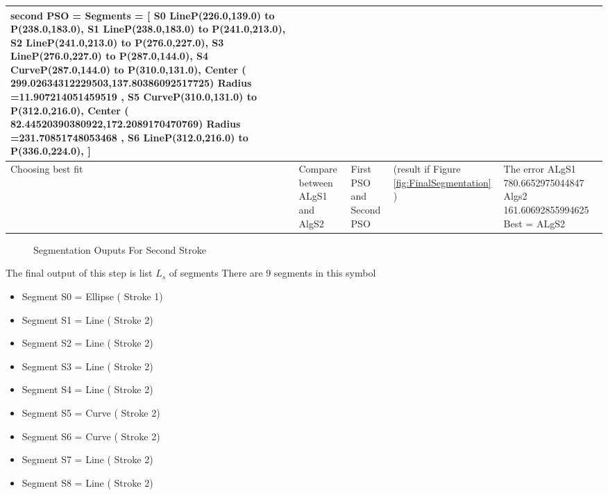 \begin{landscape}
\begin{scriptsize}
\begin{longtable}{|p{2cm}|p{2cm}|p{2cm}|p{2cm}|p{13cm}|}
  second PSO =   Segments = [   S0 Line{P(226.0,139.0) to P(238.0,183.0)},      S1 Line{P(238.0,183.0) to P(241.0,213.0)},      S2 Line{P(241.0,213.0) to P(276.0,227.0)},      S3 Line{P(276.0,227.0) to P(287.0,144.0)},      S4 Curve{P(287.0,144.0) to P(310.0,131.0),  Center ( 299.02634312229503,137.80386092517725) Radius =11.907214051459519 },  S5 Curve{P(310.0,131.0) to P(312.0,216.0),  Center ( 82.44520390380922,172.2089170470769) Radius =231.70851748053468 },  S6 Line{P(312.0,216.0) to P(336.0,224.0)}, ]  
  
 
 \\ \hline 
Choosing best fit & Compare between ALgS1 and AlgS2 &  First PSO and Second PSO  &  (result if Figure \ref{fig:FinalSegmentation} ) & 
   The error ALgS1 780.6652975044847  Algs2 161.60692855994625    Best = ALgS2  \\ \hline 
 
 
		\end{longtable}




\end{scriptsize}

\end{landscape}


\begin{figure}
	\centering
	
	\caption{Segmentation Ouputs For Second Stroke}
\end{figure}
 

The final output of this step is list $L_s$ of segments There are  9  segments in this symbol

\begin{itemize}
	\item    Segment S0  = Ellipse ( Stroke 1)
   \item Segment S1  =   Line ( Stroke 2)
     \item  Segment S2 = Line ( Stroke 2)
     \item  Segment S3  =  Line ( Stroke 2)
     \item Segment S4  =   Line ( Stroke 2)
  \item    Segment S5  =  Curve  ( Stroke 2)
     \item  Segment S6  =  Curve  ( Stroke 2)
     \item  Segment S7  =  Line   ( Stroke 2)
     \item  Segment S8  =  Line   ( Stroke 2)
\end{itemize}

